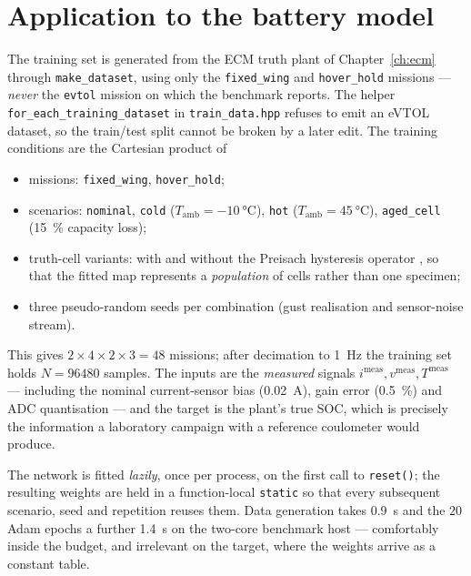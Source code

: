 \section{Application to the battery model}
The training set is generated from the ECM truth plant of Chapter~\ref{ch:ecm} through
\texttt{make\_dataset}, using only the \texttt{fixed\_wing} and \texttt{hover\_hold} missions ---
\emph{never} the \texttt{evtol} mission on which the benchmark reports.  The helper
\texttt{for\_each\_training\_dataset} in \texttt{train\_data.hpp} refuses to emit an eVTOL dataset,
so the train/test split cannot be broken by a later edit.  The training conditions are the
Cartesian product of
\begin{itemize}[nosep]
  \item missions: \texttt{fixed\_wing}, \texttt{hover\_hold};
  \item scenarios: \texttt{nominal}, \texttt{cold} ($T_\text{amb}=\SI{-10}{\celsius}$),
        \texttt{hot} ($T_\text{amb}=\SI{45}{\celsius}$), \texttt{aged\_cell} (\SI{15}{\percent}
        capacity loss);
  \item truth-cell variants: with and without the Preisach hysteresis operator
        \citep{mayergoyz1991hysteresis,baronti2014hysteresis}, so that the fitted map represents a
        \emph{population} of cells rather than one specimen;
  \item three pseudo-random seeds per combination (gust realisation and sensor-noise stream).
\end{itemize}
This gives $2\times4\times2\times3 = 48$ missions; after decimation to \SI{1}{\hertz} the training
set holds $N = \num{96480}$ samples.  The inputs are the \emph{measured} signals
$i^{\text{meas}}, v^{\text{meas}}, T^{\text{meas}}$ --- including the nominal current-sensor bias
(\SI{0.02}{\ampere}), gain error (\SI{0.5}{\percent}) and ADC quantisation --- and the target is the
plant's true SOC, which is precisely the information a laboratory campaign with a reference
coulometer would produce.

The network is fitted \emph{lazily}, once per process, on the first call to \texttt{reset()};
the resulting weights are held in a function-local \texttt{static} so that every subsequent
scenario, seed and repetition reuses them.  Data generation takes \SI{0.9}{\second} and the $20$
Adam epochs a further \SI{1.4}{\second} on the two-core benchmark host --- comfortably inside the
budget, and irrelevant on the target, where the weights arrive as a constant table.

